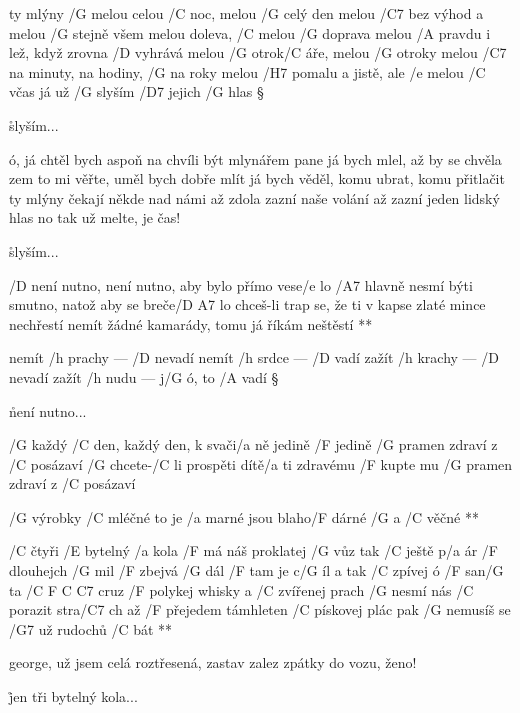 ty mlýny /G melou celou /C noc, melou /G celý den
melou /C7 bez výhod a melou /G stejně všem
melou doleva, /C melou /G doprava
melou /A pravdu i lež, když zrovna /D vyhrává
melou /G otrok/C áře, melou /G otroky
melou /C7 na minuty, na hodiny, /G na roky
melou /H7 pomalu a jistě, ale /e melou /C včas
já už /G slyším /D7 jejich /G hlas \S

\r slyším...

ó, já chtěl bych aspoň na chvíli být mlynářem
pane já bych mlel, až by se chvěla zem
to mi věřte, uměl bych dobře mlít
já bych věděl, komu ubrat, komu přitlačit
ty mlýny čekají někde nad námi
až zdola zazní naše volání
až zazní jeden lidský hlas
no tak už melte, je čas! \s

\r slyším...




\R  /D není nutno, není nutno, aby bylo přímo vese/e lo
    /A7 hlavně nesmí býti smutno, natož aby se breče/{D A7} lo \s
    chceš-li trap se, že ti v kapse zlaté mince nechřestí
    nemít žádné kamarády, tomu já říkám neštěstí **

nemít /h prachy --- /D nevadí
nemít /h srdce --- /D vadí
zažít /h krachy --- /D nevadí
zažít /h nudu --- j/G ó, to /A vadí \S

\r není nutno...




/G každý /C den, každý den, k svači/a ně jedině
/F jedině /G pramen zdraví z /C posázaví
/G chcete-/C li prospěti dítě/a ti zdravému
/F kupte mu /G pramen zdraví z /C posázaví

\R  /G výrobky /C mléčné to je /a marné
    jsou blaho/F dárné /G a /C věčné **




\R /C čtyři /E bytelný /a kola /F má náš proklatej /G vůz
   tak /C ještě p/a ár /F dlouhejch /G mil /F zbejvá /G dál /F tam je c/G íl
   a tak /C zpívej ó /F san/G ta /{C F C C7} cruz
   /F polykej whisky a /C zvířenej prach
   /G nesmí nás /C porazit stra/C7 ch
   až /F přejedem támhleten /C pískovej plác
   pak /G nemusíš se /G7 už rudochů /C bát **

george, už jsem celá roztřesená, zastav
zalez zpátky do vozu, ženo!

\r jen tři bytelný kola...

